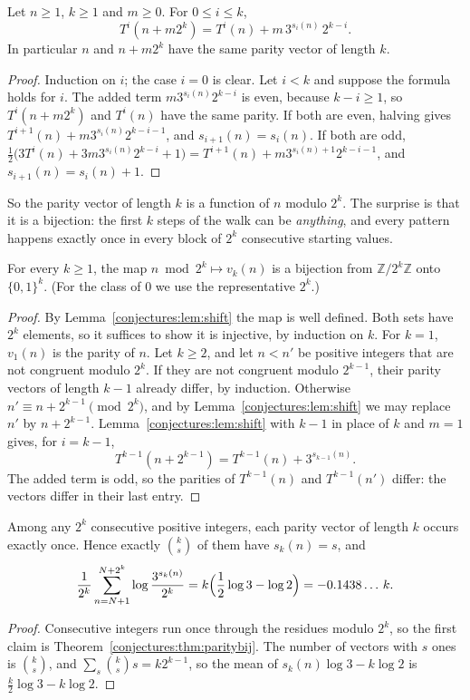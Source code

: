 \begin{lemma}\label{conjectures:lem:shift}
Let $n\ge1$, $k\ge1$ and $m\ge0$. For $0\le i\le k$,
\[
T^i(n+m2^k)=T^i(n)+m\,3^{s_i(n)}\,2^{k-i}.
\]
In particular $n$ and $n+m2^k$ have the same parity vector of length $k$.
\end{lemma}
\begin{proof}
Induction on $i$; the case $i=0$ is clear. Let $i<k$ and suppose the formula holds for $i$. The added term $m3^{s_i(n)}2^{k-i}$ is even, because
$k-i\ge1$, so $T^i(n+m2^k)$ and $T^i(n)$ have the same parity. If both are even, halving gives $T^{i+1}(n)+m3^{s_i(n)}2^{k-i-1}$, and
$s_{i+1}(n)=s_i(n)$. If both are odd, $\frac12\bigl(3T^i(n)+3m3^{s_i(n)}2^{k-i}+1\bigr)=T^{i+1}(n)+m3^{s_i(n)+1}2^{k-i-1}$, and
$s_{i+1}(n)=s_i(n)+1$.
\end{proof}

So the parity vector of length $k$ is a function of $n$ modulo $2^k$. The surprise is that it is a bijection: the first $k$ steps of the walk can be
\emph{anything}, and every pattern happens exactly once in every block of $2^k$ consecutive starting values.

\begin{theorem}\label{conjectures:thm:paritybij}
For every $k\ge1$, the map $n\bmod2^k\mapsto v_k(n)$ is a bijection from $\mathbb Z/2^k\mathbb Z$ onto $\{0,1\}^k$. (For the class of $0$ we use the
representative $2^k$.)
\end{theorem}
\begin{proof}
By Lemma~\ref{conjectures:lem:shift} the map is well defined. Both sets have $2^k$ elements, so it suffices to show it is injective, by induction on $k$. For $k=1$,
$v_1(n)$ is the parity of $n$. Let $k\ge2$, and let $n<n'$ be positive integers that are not congruent modulo $2^k$. If they are not congruent modulo
$2^{k-1}$, their parity vectors of length $k-1$ already differ, by induction. Otherwise $n'\equiv n+2^{k-1}\pmod{2^k}$, and by Lemma~\ref{conjectures:lem:shift} we may
replace $n'$ by $n+2^{k-1}$. Lemma~\ref{conjectures:lem:shift} with $k-1$ in place of $k$ and $m=1$ gives, for $i=k-1$,
\[
T^{k-1}(n+2^{k-1})=T^{k-1}(n)+3^{s_{k-1}(n)}.
\]
The added term is odd, so the parities of $T^{k-1}(n)$ and $T^{k-1}(n')$ differ: the vectors differ in their last entry.
\end{proof}

\begin{corollary}\label{conjectures:cor:coins}
Among any $2^k$ consecutive positive integers, each parity vector of length $k$ occurs exactly once. Hence exactly $\binom ks$ of them have $s_k(n)=s$, and
\[
\frac1{2^k}\sum_{n=N+1}^{N+2^k}\log\frac{3^{s_k(n)}}{2^k}=k\Bigl(\frac12\log3-\log2\Bigr)=-0.1438\ldots\,k.
\]
\end{corollary}
\begin{proof}
Consecutive integers run once through the residues modulo $2^k$, so the first claim is Theorem~\ref{conjectures:thm:paritybij}. The number of vectors with $s$ ones is
$\binom ks$, and $\sum_s\binom ks s=k2^{k-1}$, so the mean of $s_k(n)\log3-k\log2$ is $\frac k2\log3-k\log2$.
\end{proof}

